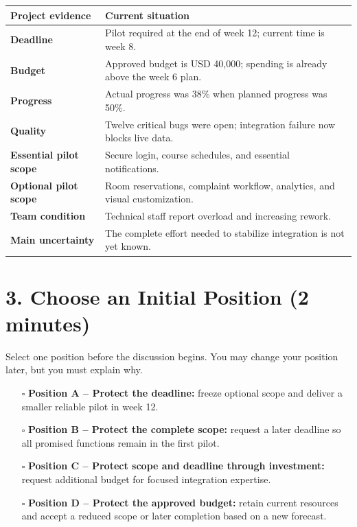 \documentclass[11pt,a4paper]{article}
\begin{document}
\begin{center}
\begin{tabularx}{\textwidth}{>{\bfseries}p{3.5cm} Y}
\toprule
Project evidence & Current situation \\
\midrule
Deadline & Pilot required at the end of week 12; current time is week 8. \\
Budget & Approved budget is USD 40,000; spending is already above the week 6 plan. \\
Progress & Actual progress was 38\% when planned progress was 50\%. \\
Quality & Twelve critical bugs were open; integration failure now blocks live data. \\
Essential pilot scope & Secure login, course schedules, and essential notifications. \\
Optional pilot scope & Room reservations, complaint workflow, analytics, and visual customization. \\
Team condition & Technical staff report overload and increasing rework. \\
Main uncertainty & The complete effort needed to stabilize integration is not yet known. \\
\bottomrule
\end{tabularx}
\end{center}

\section{3. Choose an Initial Position (2 minutes)}

Select one position before the discussion begins. You may change your position later, but you must explain why.

\begin{itemize}
  \item[$\square$] \textbf{Position A -- Protect the deadline:} freeze optional scope and deliver a smaller reliable pilot in week 12.
  \item[$\square$] \textbf{Position B -- Protect the complete scope:} request a later deadline so all promised functions remain in the first pilot.
  \item[$\square$] \textbf{Position C -- Protect scope and deadline through investment:} request additional budget for focused integration expertise.
  \item[$\square$] \textbf{Position D -- Protect the approved budget:} retain current resources and accept a reduced scope or later completion based on a new forecast.
\end{itemize}
\end{document}
